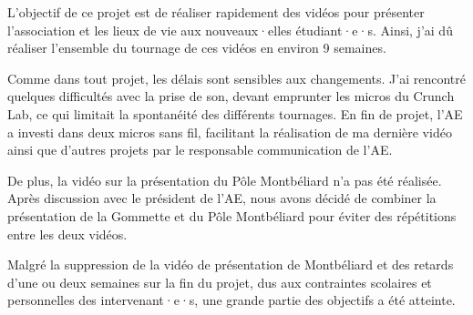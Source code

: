 L'objectif de ce projet est de réaliser rapidement des vidéos pour présenter l'association et les lieux de vie aux nouveaux·elles étudiant·e·s.
Ainsi, j'ai dû réaliser l'ensemble du tournage de ces vidéos en environ 9 semaines.

Comme dans tout projet, les délais sont sensibles aux changements.
J'ai rencontré quelques difficultés avec la prise de son, devant emprunter les micros du Crunch Lab, ce qui limitait la spontanéité des différents tournages.
En fin de projet, l'\gls{AE} a investi dans deux micros sans fil, facilitant la réalisation de ma dernière vidéo ainsi que d'autres projets par le responsable communication de l'\gls{AE}.

De plus, la vidéo sur la présentation du Pôle Montbéliard n'a pas été réalisée.
Après discussion avec le président de l'\gls{AE}, nous avons décidé de combiner la présentation de la Gommette et du Pôle Montbéliard pour éviter des répétitions entre les deux vidéos.

Malgré la suppression de la vidéo de présentation de Montbéliard et des retards d'une ou deux semaines sur la fin du projet, dus aux contraintes scolaires et personnelles des intervenant·e·s, une grande partie des objectifs a été atteinte.
